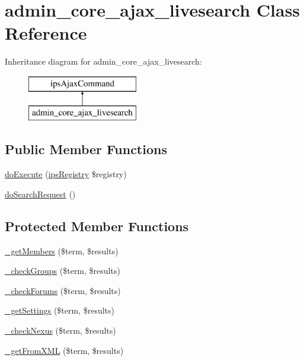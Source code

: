 \hypertarget{classadmin__core__ajax__livesearch}{\section{admin\-\_\-core\-\_\-ajax\-\_\-livesearch Class Reference}
\label{classadmin__core__ajax__livesearch}
}
Inheritance diagram for admin\-\_\-core\-\_\-ajax\-\_\-livesearch\-:\begin{figure}[H]
\begin{center}
\leavevmode
\includegraphics[height=2.000000cm]{classadmin__core__ajax__livesearch}
\end{center}
\end{figure}
\subsection*{Public Member Functions}
\begin{DoxyCompactItemize}
\item 
\hyperlink{classadmin__core__ajax__livesearch_afbc4e912a0604b94d47d66744c64d8ba}{do\-Execute} (\hyperlink{classips_registry}{ips\-Registry} \$registry)
\item 
\hyperlink{classadmin__core__ajax__livesearch_a421fae61281c7b745a46509a23d0088a}{do\-Search\-Request} ()
\end{DoxyCompactItemize}
\subsection*{Protected Member Functions}
\begin{DoxyCompactItemize}
\item 
\hyperlink{classadmin__core__ajax__livesearch_a932822070d1e3eb217afec6114993077}{\-\_\-get\-Members} (\$term, \$results)
\item 
\hyperlink{classadmin__core__ajax__livesearch_aa94aa3ddb505c2dcc0654e87559b709e}{\-\_\-check\-Groups} (\$term, \$results)
\item 
\hyperlink{classadmin__core__ajax__livesearch_ac096537046295faada13f5479b2907a4}{\-\_\-check\-Forums} (\$term, \$results)
\item 
\hyperlink{classadmin__core__ajax__livesearch_ae80a735f63dbc88d6f831bb4a39a57d6}{\-\_\-get\-Settings} (\$term, \$results)
\item 
\hyperlink{classadmin__core__ajax__livesearch_aa52465a231d9564ae110202ac6af4dc2}{\-\_\-check\-Nexus} (\$term, \$results)
\item 
\hyperlink{classadmin__core__ajax__livesearch_aac855459c7c6c7959bf6d20e4bee1726}{\-\_\-get\-From\-X\-M\-L} (\$term, \$results)
\end{DoxyCompactItemize}
